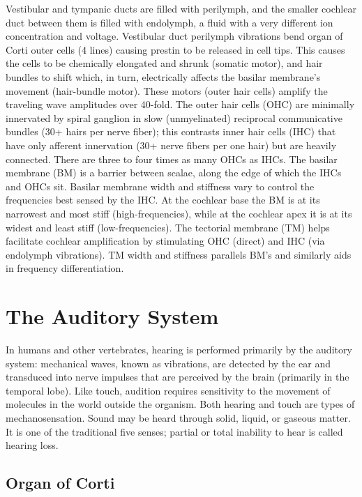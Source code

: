 Vestibular and tympanic ducts are filled with perilymph, and the smaller cochlear duct between them is filled with endolymph, a fluid with a very different ion concentration and voltage. Vestibular duct perilymph vibrations bend organ of Corti outer cells (4 lines) causing prestin to be released in cell tips. This causes the cells to be chemically elongated and shrunk (somatic motor), and hair bundles to shift which, in turn, electrically affects the basilar membrane's movement (hair-bundle motor). These motors (outer hair cells) amplify the traveling wave amplitudes over 40-fold. The outer hair cells (OHC) are minimally innervated by spiral ganglion in slow (unmyelinated) reciprocal communicative bundles (30+ hairs per nerve fiber); this contrasts inner hair cells (IHC) that have only afferent innervation (30+ nerve fibers per one hair) but are heavily connected. There are three to four times as many OHCs as IHCs. The basilar membrane (BM) is a barrier between scalae, along the edge of which the IHCs and OHCs sit. Basilar membrane width and stiffness vary to control the frequencies best sensed by the IHC. At the cochlear base the BM is at its narrowest and most stiff (high-frequencies), while at the cochlear apex it is at its widest and least stiff (low-frequencies). The tectorial membrane (TM) helps facilitate cochlear amplification by stimulating OHC (direct) and IHC (via endolymph vibrations). TM width and stiffness parallels BM's and similarly aids in frequency differentiation.

\hypertarget{the-auditory-system}{%
\section{The Auditory System}\label{the-auditory-system}}

In humans and other vertebrates, hearing is performed primarily by the auditory system: mechanical waves, known as vibrations, are detected by the ear and transduced into nerve impulses that are perceived by the brain (primarily in the temporal lobe). Like touch, audition requires sensitivity to the movement of molecules in the world outside the organism. Both hearing and touch are types of mechanosensation. Sound may be heard through solid, liquid, or gaseous matter. It is one of the traditional five senses; partial or total inability to hear is called hearing loss.

\hypertarget{organ-of-corti}{%
\subsection{Organ of Corti}\label{organ-of-corti}}

